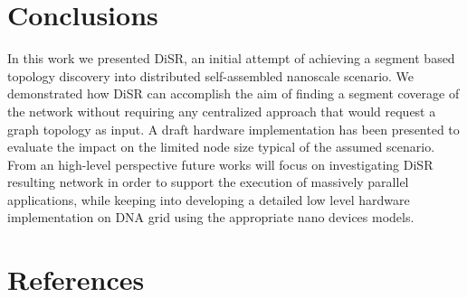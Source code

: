\documentclass[a4]{article}
\newcommand{\disr}{{\sf DiSR}}
\begin{document}







\section{Conclusions}
In this work we presented \disr{}, an initial attempt of achieving a segment based
topology discovery into distributed self-assembled nanoscale scenario. We
demonstrated how \disr{} can accomplish the aim of finding a segment
coverage of the network without requiring any centralized approach
that would request a graph topology as input. A draft hardware
implementation has been presented to evaluate the impact on the limited
node size typical of the assumed scenario. From an high-level
perspective future works will focus on
investigating \disr{} resulting network in order to support the
execution of massively parallel applications, while keeping into
developing a detailed low level hardware implementation on
DNA grid using the appropriate nano devices models.


%
% 
%

%
\section*{References}

\end{document}
